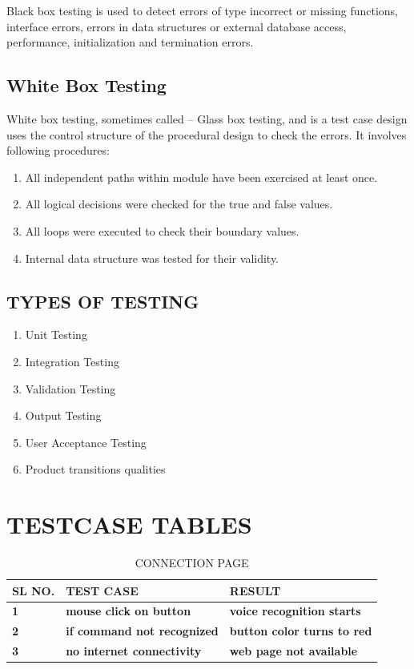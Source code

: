 \documentclass[11pt]{report} %
\begin{document}
Black box testing is used to detect errors of type incorrect or missing functions, interface errors, errors in data structures or external database access, performance, initialization and termination errors. 

\subsection{White Box Testing}
\label{subsec:White Box Testing}

White box testing, sometimes called -- Glass box testing, and is a test case design uses the control structure of the procedural design to check the errors. It involves following procedures: 

\begin{enumerate}
	\item All independent paths within module have been exercised at least once.
	\item All logical decisions were checked for the true and false values.
	\item All loops were executed to check their boundary values. 
	\item Internal data structure was tested for their validity. 
\end{enumerate}


\subsection{TYPES OF TESTING}
\label{subsec:TYPES OF TESTING}

\begin{enumerate}
	\item Unit Testing 
	\item Integration Testing
	\item Validation Testing 
	\item Output Testing 
	\item User Acceptance Testing 
	\item Product transitions qualities 
\end{enumerate}

\section{TESTCASE TABLES}
\label{sec:TESTCASE TABLES}

\begin{table}[h]
	\centering
	\caption{CONNECTION PAGE}
	\label{tab:CONNECTION PAGE}
	\begin{tabular}{|l|l|l|}
		\hline
		\textbf{SL NO.} & \textbf{TEST CASE} & \textbf{RESULT} \\ \hline
		\textbf{1}      & \textbf{mouse click on button}          & \textbf{voice recognition starts}       \\ \hline
		\textbf{2}      & \textbf{if command not recognized}          & \textbf{button color turns to red}       \\ \hline
		\textbf{3}      & \textbf{no internet connectivity}          & \textbf{web page not available}       \\ \hline
	\end{tabular}
\end{table}
\end{document}
